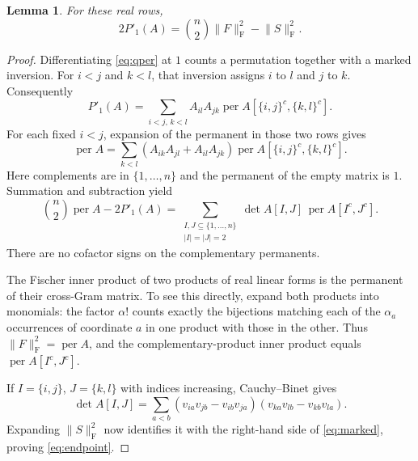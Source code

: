 \documentclass[11pt]{article}
\newtheorem{lemma}[theorem]{Lemma}
\theoremstyle{remark}
\DeclareMathOperator{\per}{per}
\newcommand{\normF}[1]{\lVert #1\rVert_{\mathrm F}}
\begin{document}
\begin{lemma}\label{lem:endpoint}
For these real rows,
\begin{equation}\label{eq:endpoint}
 2P'_1(A)=\binom n2\normF{F}^2-\normF{S}^2.
\end{equation}
\end{lemma}
\begin{proof}
Differentiating \eqref{eq:qper} at $1$ counts a permutation together with a marked inversion. For $i<j$ and $k<l$, that inversion assigns $i$ to $l$ and $j$ to $k$. Consequently
\[
 P'_1(A)=\sum_{i<j,\,k<l}A_{il}A_{jk}
                    \per A[\{i,j\}^{c},\{k,l\}^{c}].
\]
For each fixed $i<j$, expansion of the permanent in those two rows gives
\[
 \per A=\sum_{k<l}(A_{ik}A_{jl}+A_{il}A_{jk})
                   \per A[\{i,j\}^{c},\{k,l\}^{c}].
\]
Here complements are in $\{1,\ldots,n\}$ and the permanent of the empty matrix is $1$. Summation and subtraction yield
\begin{equation}\label{eq:marked}
 \binom n2\per A-2P'_1(A)
   =\sum_{\substack{I,J\subseteq\{1,\ldots,n\}\\|I|=|J|=2}}
       \det A[I,J]\,\per A[I^c,J^c].
\end{equation}
There are no cofactor signs on the complementary permanents.

The Fischer inner product of two products of real linear forms is the permanent of their cross-Gram matrix. To see this directly, expand both products into monomials: the factor $\alpha!$ counts exactly the bijections matching each of the $\alpha_a$ occurrences of coordinate $a$ in one product with those in the other. Thus $\normF{F}^2=\per A$, and the complementary-product inner product equals $\per A[I^c,J^c]$.

If $I=\{i,j\}$, $J=\{k,l\}$ with indices increasing, Cauchy--Binet gives
\[
 \det A[I,J]=\sum_{a<b}
 (v_{ia}v_{jb}-v_{ib}v_{ja})(v_{ka}v_{lb}-v_{kb}v_{la}).
\]
Expanding $\normF{S}^2$ now identifies it with the right-hand side of \eqref{eq:marked}, proving \eqref{eq:endpoint}.
\end{proof}
\end{document}
